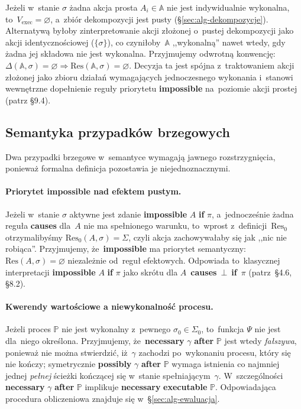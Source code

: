 \documentclass[11pt,a4paper]{article}
\newcommand{\causes}{\textbf{causes}}
\newcommand{\aft}{\textbf{after}}
\renewcommand{\iff}{\textbf{if}}
\newcommand{\impossible}{\textbf{impossible}}
\newcommand{\necessary}{\textbf{necessary}}
\newcommand{\possibly}{\textbf{possibly}}
\newcommand{\executable}{\textbf{executable}}
\theoremstyle{definition}
\begin{document}
Jeżeli w~stanie $\sigma$ żadna akcja prosta $A_i \in \mathbb{A}$ nie jest indywidualnie wykonalna, to~$V_{\mathrm{exec}}=\varnothing$, a~zbiór dekompozycji jest pusty (\S\ref{sec:alg-dekompozycje}). Alternatywą byłoby zinterpretowanie akcji złożonej o~pustej dekompozycji jako akcji identycznościowej ($\{\sigma\}$), co czyniłoby~$\mathbb{A}$ ,,wykonalną'' nawet wtedy, gdy żadna jej składowa nie jest wykonalna. Przyjmujemy odwrotną konwencję: $\Delta(\mathbb{A},\sigma)=\varnothing \Rightarrow \mathrm{Res}(\mathbb{A},\sigma)=\varnothing$. Decyzja ta jest spójna z~traktowaniem akcji złożonej jako zbioru działań wymagających jednoczesnego wykonania i~stanowi wewnętrzne dopełnienie reguły priorytetu \impossible{} na~poziomie akcji prostej (patrz \S9.4).

\subsection{Semantyka przypadków brzegowych}

Dwa przypadki brzegowe w~semantyce wymagają jawnego rozstrzygnięcia, ponieważ formalna definicja pozostawia je niejednoznacznymi.

\paragraph{Priorytet \impossible{} nad efektem pustym.}
Jeżeli w~stanie $\sigma$ aktywne jest zdanie \impossible{} $A$ \iff{} $\pi$, a~jednocześnie żadna reguła \causes{} dla~$A$ nie ma spełnionego warunku, to~wprost z~definicji~$\mathrm{Res}_0$ otrzymalibyśmy $\mathrm{Res}_0(A,\sigma)=\Sigma$, czyli akcja zachowywałaby się jak ,,nic nie robiąca''. Przyjmujemy, że~\impossible{} ma priorytet semantyczny: $\mathrm{Res}(A,\sigma)=\varnothing$ niezależnie od~reguł efektowych. Odpowiada to~klasycznej interpretacji \impossible{} $A$ \iff{} $\pi$ jako skrótu dla \mbox{$A$ \causes{} $\bot$ \iff{} $\pi$} (patrz~\S4.6, \S8.2).

\paragraph{Kwerendy wartościowe a niewykonalność procesu.}
Jeżeli proces $\mathbb{P}$ nie jest wykonalny z~pewnego $\sigma_0 \in \Sigma_0$, to~funkcja $\Psi$ nie jest dla~niego określona. Przyjmujemy, że~\necessary{} $\gamma$ \aft{} $\mathbb{P}$ jest wtedy \emph{fałszywa}, ponieważ nie można stwierdzić, iż~$\gamma$ zachodzi po~wykonaniu procesu, który się nie kończy; symetrycznie \possibly{} $\gamma$ \aft{} $\mathbb{P}$ wymaga istnienia co najmniej jednej \emph{pełnej} ścieżki kończącej się w~stanie spełniającym~$\gamma$. W~szczególności \necessary{} $\gamma$ \aft{} $\mathbb{P}$ implikuje \necessary{} \executable{} $\mathbb{P}$. Odpowiadająca procedura obliczeniowa znajduje się w~\S\ref{sec:alg-ewaluacja}.
\end{document}
